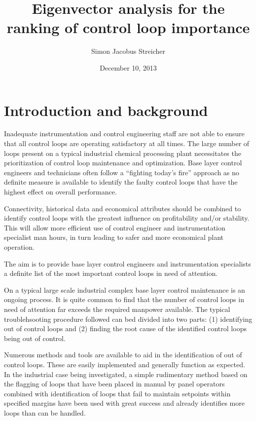 \documentclass{article}
\newcommand{\subtitle}[1]{%
  \posttitle{%
    \par\end{center}
    \begin{center}\large#1\end{center}
    \vskip0.5em}%
  }
\begin{document}
\title{Eigenvector analysis for the ranking of control loop importance}
\subtitle{Research proposal}
\date{December 10, 2013}
\author{Simon Jacobus Streicher}
\maketitle

\newpage

\tableofcontents

\newpage


\section{Introduction and background}

Inadequate instrumentation and control engineering staff are not able to ensure that all control loops are operating satisfactory at all times.
The large number of loops present on a typical industrial chemical processing plant necessitates the prioritization of control loop maintenance and optimization.
Base layer control engineers and technicians often follow a “fighting today’s fire” approach as no definite measure is available to identify the faulty control loops that have the highest effect on overall performance.

Connectivity, historical data and economical attributes should be combined to identify control loops with the greatest influence on profitability and/or stability.
This will allow more efficient use of control engineer and instrumentation specialist man hours, in turn leading to safer and more economical plant operation.


The aim is to provide base layer control engineers and instrumentation specialists a definite list of the most important control loops in need of attention.

On a typical large scale industrial complex base layer control maintenance is an ongoing process.
It is quite common to find that the number of control loops in need of attention far exceeds the required manpower available.
The typical troublehsooting procedure followed can bed divided into two parts:
(1) identifying out of control loops and
(2) finding the root cause of the identified control loops being out of control.

Numerous methods and tools are available to aid in the identification of out of control loops.
These are easily implemented and generally function as expected.
In the industrial case being investigated, a simple rudimentary method based on the flagging of loops that have been placed in manual by panel operators combined with identification of loops that fail to maintain setpoints within specified margins have been used with great success and already identifies more loops than can be handled.
\end{document}
